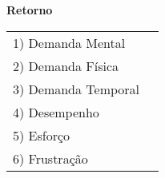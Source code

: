 \textbf{Retorno}

\begin{table}[!h]
    \centering
    \def\arraystretch{0.5}
    \begin{tabular}{m{} m{}}
        1) Demanda Mental & \\
        2) Demanda Física & \\
        3) Demanda Temporal & \\
        4) Desempenho     & \\
        5) Esforço        & \\
        6) Frustração     & \\
    \end{tabular}
\end{table}

\pagebreak